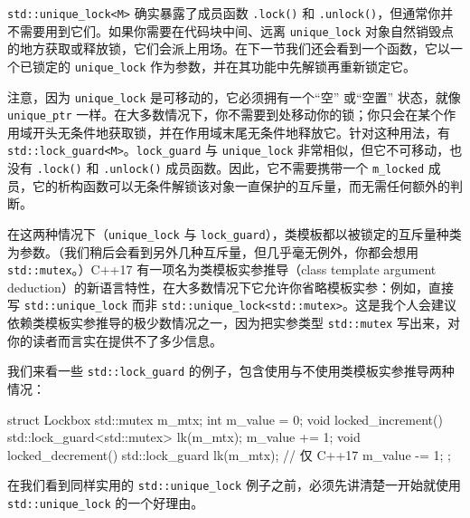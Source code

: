 \texttt{std::\allowbreak{}unique\_\allowbreak{}lock<\allowbreak{}M>\allowbreak{}} 确实暴露了成员函数 \texttt{.lock(\allowbreak{})\allowbreak{}} 和 \texttt{.unlock(\allowbreak{})\allowbreak{}}，但通常你并不需要用到它们。如果你需要在代码块中间、远离 \texttt{unique\_\allowbreak{}lock} 对象自然销毁点的地方获取或释放锁，它们会派上用场。在下一节我们还会看到一个函数，它以一个已锁定的 \texttt{unique\_\allowbreak{}lock} 作为参数，并在其功能中先解锁再重新锁定它。

注意，因为 \texttt{unique\_\allowbreak{}lock} 是可移动的，它必须拥有一个“空” 或“空置” 状态，就像 \texttt{unique\_\allowbreak{}ptr} 一样。在大多数情况下，你不需要到处移动你的锁；你只会在某个作用域开头无条件地获取锁，并在作用域末尾无条件地释放它。针对这种用法，有 \texttt{std::\allowbreak{}lock\_\allowbreak{}guard<\allowbreak{}M>\allowbreak{}}。\texttt{lock\_\allowbreak{}guard} 与 \texttt{unique\_\allowbreak{}lock} 非常相似，但它不可移动，也没有 \texttt{.lock(\allowbreak{})\allowbreak{}} 和 \texttt{.unlock(\allowbreak{})\allowbreak{}} 成员函数。因此，它不需要携带一个 \texttt{m\_\allowbreak{}locked} 成员，它的析构函数可以无条件解锁该对象一直保护的互斥量，而无需任何额外的判断。

在这两种情况下（\texttt{unique\_\allowbreak{}lock} 与 \texttt{lock\_\allowbreak{}guard}），类模板都以被锁定的互斥量种类为参数。（我们稍后会看到另外几种互斥量，但几乎毫无例外，你都会想用 \texttt{std::\allowbreak{}mutex}。）C++17 有一项名为类模板实参推导（class template argument deduction）的新语言特性，在大多数情况下它允许你省略模板实参：例如，直接写 \texttt{std::\allowbreak{}unique\_\allowbreak{}lock} 而非 \texttt{std::\allowbreak{}unique\_\allowbreak{}lock<\allowbreak{}std::\allowbreak{}mutex>\allowbreak{}}。这是我个人会建议依赖类模板实参推导的极少数情况之一，因为把实参类型 \texttt{std::\allowbreak{}mutex} 写出来，对你的读者而言实在提供不了多少信息。

我们来看一些 \texttt{std::\allowbreak{}lock\_\allowbreak{}guard} 的例子，包含使用与不使用类模板实参推导两种情况：

\begin{codebox}[cpp]
    struct Lockbox {
      std::mutex m_mtx;
      int m_value = 0;
      void locked_increment() {
        std::lock_guard<std::mutex> lk(m_mtx);
        m_value += 1;
      }
      void locked_decrement() {
        std::lock_guard lk(m_mtx); // 仅 C++17
        m_value -= 1;
      }
    };
\end{codebox}

在我们看到同样实用的 \texttt{std::\allowbreak{}unique\_\allowbreak{}lock} 例子之前，必须先讲清楚一开始就使用 \texttt{std::\allowbreak{}unique\_\allowbreak{}lock} 的一个好理由。

